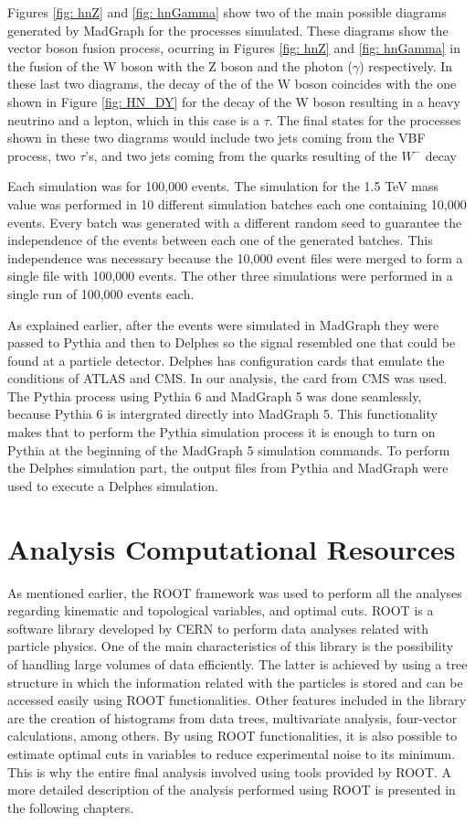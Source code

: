 Figures \ref{fig: hnZ} and \ref{fig: hnGamma} show two of the main possible diagrams generated by MadGraph for the processes simulated. These diagrams show the vector boson fusion process, ocurring in Figures \ref{fig: hnZ} and \ref{fig: hnGamma} in the fusion of the W boson with the Z boson and the photon ($\gamma$) respectively. In these last two diagrams, the decay of the of the W boson coincides with the one shown in Figure \ref{fig: HN_DY} for the decay of the W boson resulting in a heavy neutrino and a lepton, which in this case is a $\tau$. The final states for the processes shown in these two diagrams would include two jets coming from the VBF process, two $\tau$'s, and two jets coming from the quarks resulting of the $W^{-}$ decay

Each simulation was for 100,000 events. The simulation for the 1.5 TeV mass value was performed in 10 different simulation batches each one containing 10,000 events. Every batch was generated with a different random seed to guarantee the independence of the events between each one of the generated batches. This independence was necessary because the 10,000 event files were merged to form a single file with 100,000 events. The other three simulations were performed in a single run of 100,000 events each.

As explained earlier, after the events were simulated in MadGraph they were passed to Pythia and then to Delphes so the signal resembled one that could be found at a particle detector. Delphes has configuration cards that emulate the conditions of ATLAS and CMS. In our analysis, the card from CMS was used. The Pythia process using Pythia 6 and MadGraph 5 was done seamlessly, because Pythia 6 is intergrated directly into MadGraph 5. This functionality makes that to perform the Pythia simulation process it is enough to turn on Pythia at the beginning of the MadGraph 5 simulation commands. To perform the Delphes simulation part, the output files from Pythia and MadGraph were used to execute a Delphes simulation.

\section{Analysis Computational Resources}

As mentioned earlier, the ROOT framework was used to perform all the analyses regarding kinematic and topological variables, and optimal cuts. ROOT is a software library developed by CERN to perform data analyses related with particle physics. One of the main characteristics of this library is the possibility of handling large volumes of data efficiently. The latter is achieved by using a tree structure in which the information related with the particles is stored and can be accessed easily using ROOT functionalities. Other features included in the library are the creation of histograms from data trees, multivariate analysis, four-vector calculations, among others. By using ROOT functionalities, it is also possible to estimate optimal cuts in variables to reduce experimental noise to its minimum. This is why the entire final analysis involved using tools provided by ROOT. A more detailed description of the analysis performed using ROOT is presented in the following chapters.

